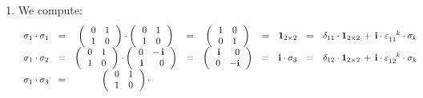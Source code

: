 \begin{enumerate}
\item
    We compute:
    \begin{equation*}
    \begin{array}{ccccccrcc}
    \sigma_{1} \cdot \sigma_{1}
    & = &
        \left(\,\begin{array}{rr}
            0 & 1
            \\
            1 & 0
            \end{array}\,\right)
        \cdot
        \left(\,\begin{array}{rr}
            0 & 1
            \\
            1 & 0
            \end{array}\,\right)
    & = &
        \left(\,\begin{array}{rr}
            1 & 0
            \\
            0 & 1
            \end{array}\,\right)
    & = &
        \boldsymbol{1}_{2 \times 2}
    & = &
        \delta_{11}\cdot\boldsymbol{1}_{2 \times 2}
        \, + \,
        \i\cdot\varepsilon_{11{\color{white}k}}^{{\color{white}11}k}\cdot\sigma_{k}
    \\
    \sigma_{1} \cdot \sigma_{2}
    & = &
        \left(\,\begin{array}{rr}
            0 & 1
            \\
            1 & 0
            \end{array}\,\right)
        \cdot
        \left(\,\begin{array}{rr}
            0 & -\,\i
            \\
            \i & 0
            \end{array}\,\right)
    & = &
        \left(\,\begin{array}{rr}
            \i & 0
            \\
            0 & -\i
            \end{array}\,\right)
    & = &
        \i\cdot\sigma_{3}
    & = &
        \delta_{12}\cdot\boldsymbol{1}_{2 \times 2}
        \, + \,
        \i\cdot\varepsilon_{12{\color{white}k}}^{{\color{white}12}k}\cdot\sigma_{k}
    \\
    \sigma_{1} \cdot \sigma_{3}
    & = &
        \left(\,\begin{array}{rr}
            0 & 1
            \\
            1 & 0
            \end{array}\,\right)
        \cdot

\end{array}
\end{equation*}
\end{enumerate}
